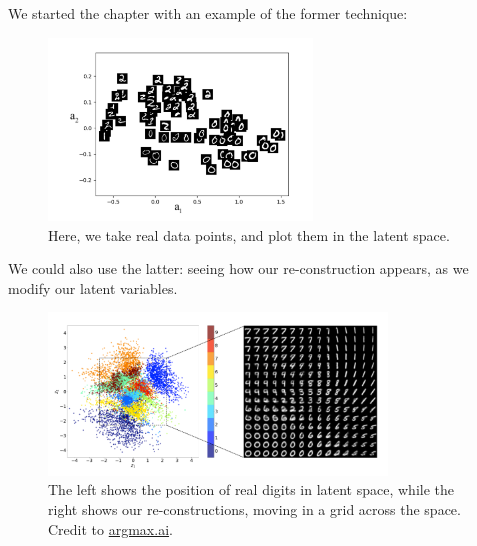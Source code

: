         \miniex We started the chapter with an example of the former technique:

        \begin{figure}[H]
            \centering
            \includegraphics[width=70mm,scale=0.5]{images/autoencoder_images/mnist_compression.png}
            \caption*{Here, we take real data points, and plot them in the latent space.}
        \end{figure}

        \miniex We could also use the latter: seeing how our re-construction appears, as we modify our latent variables.

        \begin{figure}[H]
            \centering
            \includegraphics[width=90mm,scale=0.5]{images/autoencoder_images/latent_space.png}
            \caption*{The left shows the position of real digits in latent space, while the right shows our re-constructions, moving in a grid across the space. Credit to \href{https://argmax.ai/blog/vhp-vae/}{argmax.ai}.}
        \end{figure}

